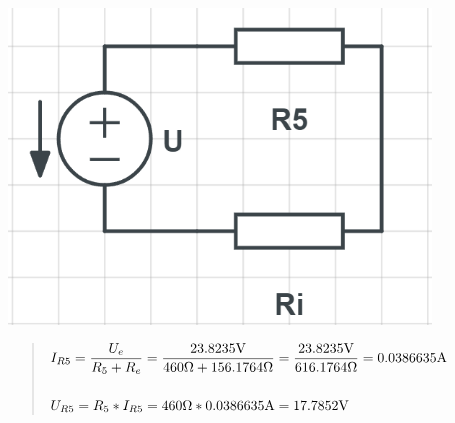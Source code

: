 \begin{figure}[H]
    \centering
    \includegraphics[scale=0.5]{pic2/u2o4.png}
    \begin{quote}
        \centering
	   $I_{R5} = \dfrac{U_e}{R_5 + R_e} = \dfrac{23.8235\Vo}{460\Omega + 156.1764\Omega}
	   = \dfrac{23.8235\Vo}{616.1764\Omega} = 0.0386635\Am$ \\~\\
	   $U_{R5} = R_5 * I_{R5} = 460\Omega * 0.0386635\Am = 17.7852\Vo$
    \end{quote}
\end{figure}